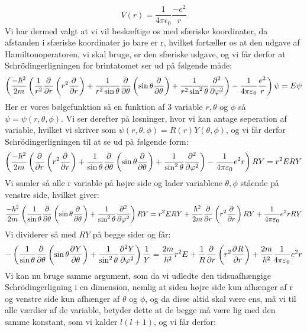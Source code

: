 \documentclass[../../Atom-ogMolekylefysik.tex]{subfiles}
\begin{document}
\begin{equation*}
    V(r)=\frac{1}{4\pi\epsilon_{0}}\frac{-e^2}{r}
\end{equation*}
Vi har dermed valgt at vi vil beskæftige os med sfæriske koordinater, da afstanden i sfæriske koordinater jo bare er r, hvilket fortæller os at den udgave af Hamiltonoperatoren, vi skal bruge, er den sfæriske udgave, og vi får derfor at Schrödingerligningen for brintatomet ser ud på følgende måde:
\begin{equation}
    \left(\frac{-\hbar^2}{2m}\left(\frac{1}{r^2}\pdif{r}{}\left(r^2\pdif{r}{}\right)+\frac{1}{r^2\sin\theta}\pdif{\theta}{}\left(\sin \theta\pdif{\theta}{}\right)+\frac{1}{r^2\sin^2\theta}\pdif[2]{\phi}{}\right)-\frac{1}{4\pi\epsilon_{0}}\frac{e^2}{r}\right)\psi=E\psi
\end{equation}
Her er vores bølgefunktion så en funktion af 3 variable $r,\theta$ og $\phi$ så $\psi=\psi(r,\theta,\phi)$. Vi ser derefter på løsninger, hvor vi kan antage seperation af variable, hvilket vi skriver som $\psi(r,\theta,\phi)=R(r)Y(\theta,\phi)$, og vi får derfor Schrödingerligningen til at se ud på følgende form:
\begin{equation}
    \left(\frac{-\hbar^2}{2m}\left(\pdif{r}{}\left(r^2\pdif{r}{}\right)+\frac{1}{\sin\theta}\pdif{\theta}{}\left(\sin \theta\pdif{\theta}{}\right)+\frac{1}{\sin^2\theta}\pdif[2]{\phi}{}\right)-\frac{1}{4\pi\epsilon_{0}}e^2r\right)RY=r^{2}ERY
\end{equation}
Vi samler så alle r variable på højre side og lader variablene $\theta,\phi$ stående på venstre side, hvilket giver:
\begin{equation}
    \frac{-\hbar^2}{2m}\left(\frac{1}{\sin\theta}\pdif{\theta}{}\left(\sin \theta\pdif{\theta}{}\right)+\frac{1}{\sin^2\theta}\pdif[2]{\phi}{}\right)RY=r^{2}ERY+\frac{\hbar^2}{2m}\pdif{r}{}\left(r^2\pdif{r}{}\right)RY+\frac{1}{4\pi\epsilon_{0}}e^2rRY
\end{equation}
Vi dividerer så med $RY$ på begge sider og får:
\begin{equation}
    -\left(\frac{1}{\sin\theta}\pdif{\theta}{}\left(\sin \theta\pdif{\theta}{Y}\right)+\frac{1}{\sin^2\theta}\pdif[2]{\phi}{Y}\right)\frac{1}{Y}=\frac{2m}{\hbar^2}r^{2}E+\frac{1}{R}\pdif{r}{}\left(r^2\pdif{r}{R}\right)+\frac{2m}{\hbar^2}\frac{1}{4\pi\epsilon_{0}}e^2r
\end{equation}
Vi kan nu bruge samme argument, som da vi udledte den tidsuafhængige Schrödingerligning i en dimension, nemlig at siden højre side kun afhænger af r og venstre side kun afhænger af $\theta$ og $\phi$, og da disse altid skal være ens, må vi til alle værdier af de variable, betyder dette at de begge må være lig med den samme konstant, som vi kalder $l(l+1)$, og vi får derfor:
\end{document}
